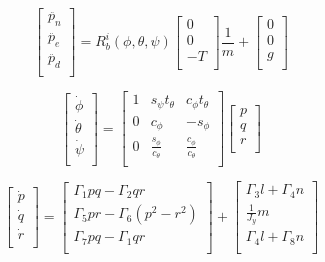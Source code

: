 \documentclass[dvips,12pt]{article}
\begin{document}
\singlespacing
\begin{equation}
\begin{bmatrix}
\ddot{p_n} \\
\ddot{p_e} \\
\ddot{p_d} \\
\end{bmatrix}
=
R_b^i(\phi, \theta, \psi)
\begin{bmatrix}
0  \\
0  \\
-T \\
\end{bmatrix}
\frac{1}{m} +
\begin{bmatrix}
0 \\
0 \\
g \\
\end{bmatrix}
\end{equation}
\doublespacing

\singlespacing
\begin{equation}
\begin{bmatrix}
\dot{\phi} \\
\dot{\theta} \\
\dot{\psi} \\
\end{bmatrix}
=
\begin{bmatrix}
1 & s_{\psi}t_{\theta} & c_{\phi}t_{\theta} \\
0 & c_{\phi}           & -s_{\phi}          \\
0 & \frac{s_{\phi}}{c_{\theta}} & \frac{c_{\phi}}{c_{\theta}} \\
\end{bmatrix}
\begin{bmatrix}
p \\
q \\
r \\
\end{bmatrix}
\end{equation}
\doublespacing

\singlespacing
\begin{equation}
\begin{bmatrix}
\dot{p} \\
\dot{q} \\
\dot{r} \\
\end{bmatrix}
=
\begin{bmatrix}
\Gamma_1pq - \Gamma_2qr \\
\Gamma_5pr - \Gamma_6(p^2-r^2) \\
\Gamma_7pq - \Gamma_1qr \\
\end{bmatrix}
+
\begin{bmatrix}
\Gamma_3l + \Gamma_4n \\
\frac{1}{J_y}m \\
\Gamma_4l + \Gamma_8n \\
\end{bmatrix}
\end{equation}
\doublespacing
\end{document}

